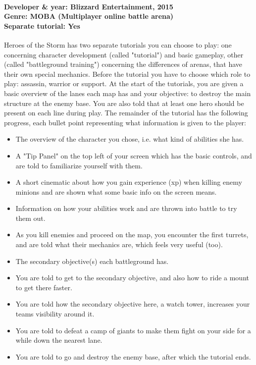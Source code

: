 \paragraph{Developer \& year: Blizzard Entertainment, 2015 \\ Genre: MOBA (Multiplayer online battle arena) \\ Separate tutorial: Yes \\}
Heroes of the Storm has two separate tutorials you can choose to play: one concerning character development (called "tutorial") and basic gameplay, other (called "battleground training") concerning the differences of arenas, that have their own special mechanics.
Before the tutorial you have to choose which role to play: assassin, warrior or support.
At the start of the tutorials, you are given a basic overview of the lanes each map has and your objective: to destroy the main structure at the enemy base. You are also told that at least one hero should be present on each line during play. The remainder of the tutorial has the following progress, each bullet point representing what information is given to the player:
\begin{itemize}

\item The overview of the character you chose, i.e. what kind of abilities she has.
\item A "Tip Panel" on the top left of your screen which has the basic controls, and are told to familiarize yourself with them.
\item A short cinematic about how you gain experience (xp) when killing enemy minions and are shown what some basic info on the screen means.
\item Information on how your abilities work and are thrown into battle to try them out.
\item As you kill enemies and proceed on the map, you encounter the first turrets, and are told what their mechanics are, which feels very useful (too).
\item The secondary objective(s) each battleground has.
\item You are told to get to the secondary objective, and also how to ride a mount to get there faster.
\item You are told how the secondary objective here, a watch tower, increases your teams visibility around it.
\item You are told to defeat a camp of giants to make them fight on your side for a while down the nearest lane.
\item You are told to go and destroy the enemy base, after which the tutorial ends.
\end{itemize}

